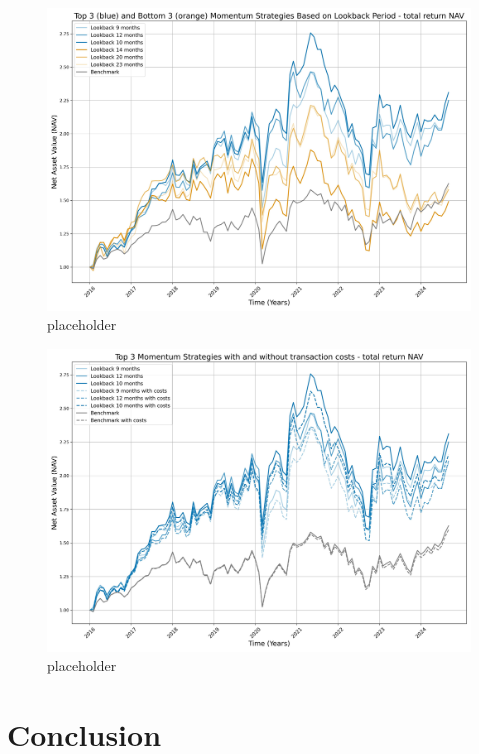 \documentclass[a4paper,12pt,twoside]{article}
\begin{document}
\begin{figure}[h]
    \centering
    \includegraphics[width=16cm]{figures/fig_bm.jpg}
    \caption{placeholder}
    \label{fig:bm}
\end{figure}

\begin{figure}[h]
    \centering
    \includegraphics[width=16cm]{figures/fig_costs.jpg}
    \caption{placeholder}
    \label{fig:costs}
\end{figure}



\clearpage
\newpage
\section{Conclusion}


\clearpage


	
	
\end{document}
